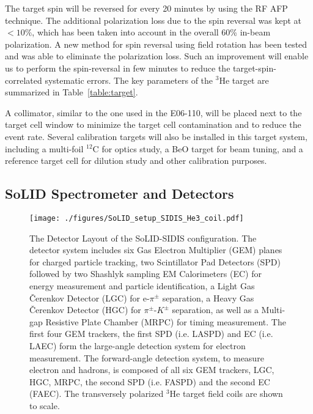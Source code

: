The target spin will be reversed for every 20 minutes by using the RF AFP
technique. The additional polarization loss due to the spin reversal was kept
at $<10\%$, which has been taken into account in the overall 60\% in-beam
polarization. A new method for spin reversal using field rotation has been
tested and was able to eliminate the polarization loss. Such an improvement
will enable us to perform the spin-reversal in few minutes to reduce the
target-spin-correlated systematic errors. The key parameters of the
$\mathrm{^{3}He}$ target are summarized in Table~\ref{table:target}.
  
A collimator, similar to the one used in the E06-110, will be placed next to
the target cell window to minimize the target cell contamination and to reduce
the event rate. Several calibration targets will also be installed in this
target system, including a multi-foil $^{12}$C for optics study, a BeO target
for beam tuning, and a reference target cell for dilution study and other
calibration purposes.
  
  \subsection {SoLID Spectrometer and Detectors} 
\begin{figure}[!h]
 \begin{center}
  \texttt{[image: ./figures/SoLID\_setup\_SIDIS\_He3\_coil.pdf]}
   \caption[The Detector Layout of the SoLID-SIDIS
     configuration]{\footnotesize{The Detector Layout of the SoLID-SIDIS
       configuration. The detector system includes six Gas Electron Multiplier
       (GEM) planes for charged particle tracking, two Scintillator Pad
       Detectors (SPD) followed by two Shashlyk sampling EM Calorimeters (EC)
       for energy measurement and particle identification, a Light Gas
       \v{C}erenkov Detector (LGC) for e-$\pi^{\pm}$ separation, a Heavy Gas
       \v{C}erenkov Detector (HGC) for $\pi^{\pm}$-$K^{\pm}$ separation, as
       well as a Multi-gap Resistive Plate Chamber (MRPC) for timing
       measurement. The first four GEM trackers, the first SPD (i.e. LASPD) and
       EC (i.e. LAEC) form the large-angle detection system for electron
       measurement. The forward-angle detection system, to measure electron and
       hadrons, is composed of all six GEM trackers, LGC, HGC, MRPC, the second
       SPD (i.e. FASPD) and the second EC (FAEC).}  The transversely polarized
     $^3$He target field coils are shown to scale.}
   \label{solid_sidis}
 \end{center}
\end{figure}

